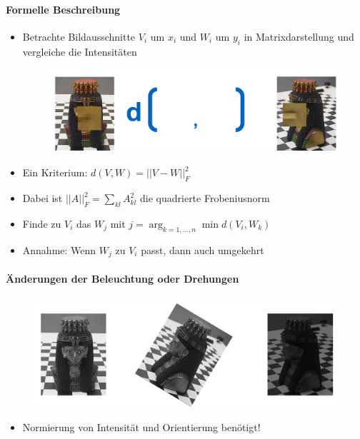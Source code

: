 \documentclass[12pt, a4paper, oneside]{article}
\begin{document}
\paragraph*{Formelle Beschreibung}
\begin{itemize}
  \item Betrachte Bildausschnitte $V_i$ um $x_i$ und $W_i$ um $y_i$ in Matrixdarstellung und vergleiche die Intensitäten
  \begin{figure}[htbp]
      \centering
      \includegraphics[scale=0.6]{../img/1-14.png}
      \label{img/1-14}
  \end{figure}
  \item Ein Kriterium: $d(V,W)=||V-W||_F^2$
  \item Dabei ist $||A||_F^2=\sum\limits_{kl}A_{kl}^2$ die quadrierte Frobeniusnorm
  \item Finde zu $V_i$ das $W_j$ mit $j=\arg_{k=1,...,n}\min d(V_i,W_k)$
  \item Annahme: Wenn $W_j$ zu $V_i$ passt, dann auch umgekehrt
\end{itemize}
\paragraph*{Änderungen der Beleuchtung oder Drehungen}
\begin{figure}[htbp]
    \centering
    \includegraphics[scale=0.6]{../img/1-15.png}
    \label{img/1-15}
\end{figure}
\begin{itemize}
  \item Normierung von Intensität und Orientierung benötigt!
\end{itemize}
\end{document}

